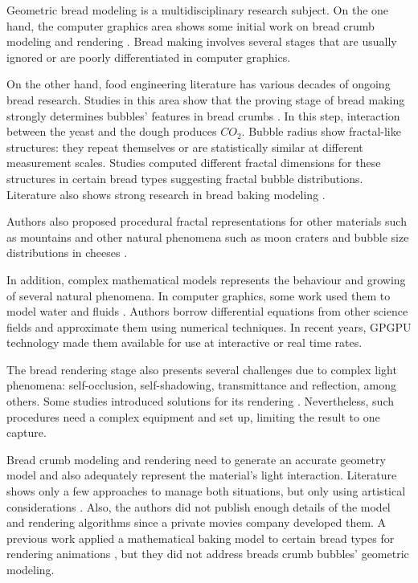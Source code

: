\documentclass[final,5p,times]{elsarticle}
\begin{document}
Geometric bread modeling is a multidisciplinary research subject. On the one hand, the computer graphics area shows some initial work on bread crumb modeling and rendering \cite{Tong2005,Cho2007}.  Bread making involves several stages that are usually ignored or are poorly differentiated in computer graphics.

On the other hand, food engineering literature has various decades of ongoing bread research. Studies in this area show that the proving stage of bread making strongly determines bubbles' features  in bread crumbs \cite{Babin2006}. In this step, interaction between the yeast and the dough produces {\em $CO_{2}$}. Bubble radius show fractal-like structures: they repeat themselves or are statistically similar at different measurement scales. Studies computed different fractal dimensions for these structures in certain bread types \cite{Gonzales2008} suggesting fractal bubble distributions. Literature also shows strong research in bread baking modeling \cite{Mondal2008}.

Authors also proposed procedural fractal representations for other materials such as mountains \cite{Prusinkiewicz1993} and other natural phenomena such as moon craters and bubble size distributions in cheeses \cite{Mandelbrot1982}. 


In addition, complex mathematical models represents the behaviour and growing of several natural phenomena. In computer graphics, some work used them to model water and fluids \cite{Stam1999,Fedkiw2001}. Authors borrow differential equations from other science fields and approximate them using numerical techniques. In recent years, GPGPU technology \cite{Owens2007} made them available for use at interactive or real time rates.

The bread rendering stage also presents several challenges due to complex light phenomena: self-occlusion, self-shadowing, transmittance and reflection, among others. Some studies introduced solutions for its rendering \cite{Tong2005}. Nevertheless, such procedures need a complex equipment and set up, limiting the result to one capture. 

Bread crumb modeling and rendering need to generate an accurate geometry model and also adequately represent the material's light interaction. Literature shows only a few approaches to manage both situations, but only using artistical considerations \cite{Cho2007}. Also, the authors did not publish enough details of the model and rendering algorithms since a private movies company developed them. A previous work applied a mathematical baking model to certain bread types for rendering animations \cite{Rodriguez-Arenas2011}, but they did not address breads crumb bubbles' geometric modeling.
\end{document}
